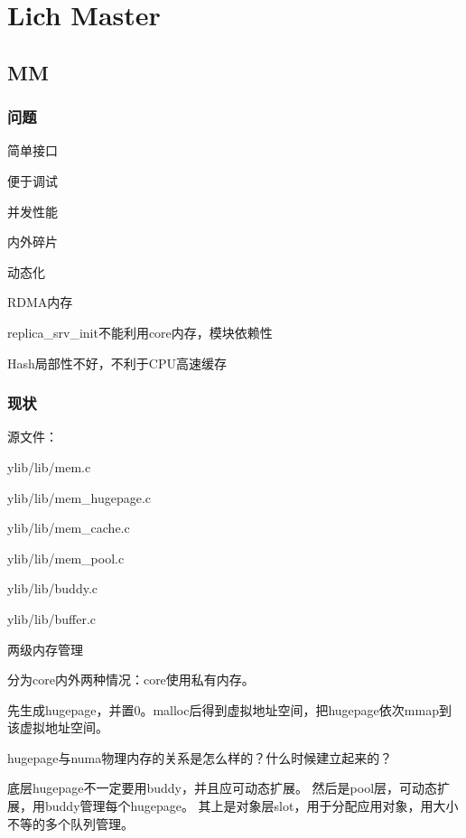 \chapter{Lich Master}

\section{MM}

\subsection{问题}

\begin{enumbox}
\item 简单接口
\item 便于调试
\item 并发性能
\item 内外碎片
\item 动态化
\item RDMA内存
\item replica\_srv\_init不能利用core内存，模块依赖性
\item Hash局部性不好，不利于CPU高速缓存
\end{enumbox}

\subsection{现状}

源文件：
\begin{enumbox}
\item ylib/lib/mem.c
\item ylib/lib/mem\_hugepage.c
\item ylib/lib/mem\_cache.c
\item ylib/lib/mem\_pool.c
\item ylib/lib/buddy.c
\item ylib/lib/buffer.c
\end{enumbox}

两级内存管理

分为core内外两种情况：core使用私有内存。

先生成hugepage，并置0。malloc后得到虚拟地址空间，把hugepage依次mmap到该虚拟地址空间。

hugepage与numa物理内存的关系是怎么样的？什么时候建立起来的？

底层hugepage不一定要用buddy，并且应可动态扩展。
然后是pool层，可动态扩展，用buddy管理每个hugepage。
其上是对象层slot，用于分配应用对象，用大小不等的多个队列管理。

